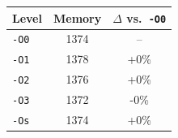 \begin{tabular*}{\columnwidth}{@{\extracolsep\fill}lcc@{\extracolsep\fill}}
\toprule
\textbf{Level} & \textbf{Memory} & \textbf{$\Delta$ vs.\ \texttt{-O0}} \\
\midrule
\texttt{-O0} & 1374 & -- \\
\texttt{-O1} & 1378 & +0\% \\
\texttt{-O2} & 1376 & +0\% \\
\texttt{-O3} & 1372 & -0\% \\
\texttt{-Os} & 1374 & +0\% \\
\bottomrule
\end{tabular*}
